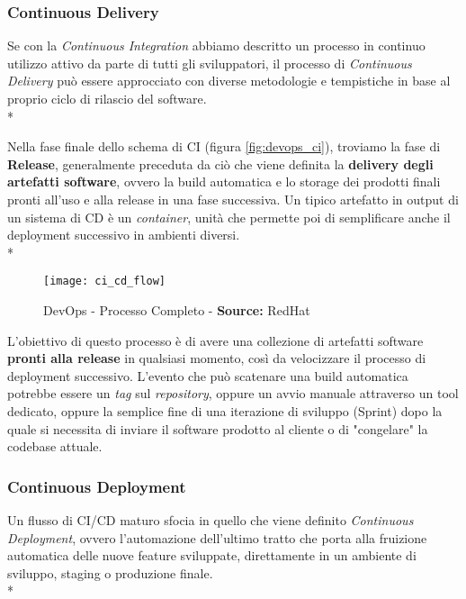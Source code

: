 \documentclass[../main.tex]{subfiles}
\begin{document}
        		\subsubsection{Continuous Delivery}
        			
        			Se con la \emph{Continuous Integration} abbiamo descritto un processo in continuo utilizzo attivo da parte di tutti gli sviluppatori, il processo di \emph{Continuous Delivery}\cite{devops_cicd} può essere approcciato con diverse metodologie e tempistiche in base al proprio ciclo di rilascio del software.\\*
        			
        			Nella fase finale dello schema di CI (figura \ref{fig:devops_ci}), troviamo la fase di \textbf{Release}, generalmente preceduta da ciò che viene definita la \textbf{delivery degli artefatti software}, ovvero la build automatica e lo storage dei prodotti finali pronti all'uso e alla release in una fase successiva. Un tipico artefatto in output di un sistema di CD è un \emph{container}, unità che permette poi di semplificare anche il deployment successivo in ambienti diversi.\\*
        			
        			\begin{figure}[ht]
        				\centering
        				\texttt{[image: ci\_cd\_flow]}
        				\caption{DevOps - Processo Completo - \textbf{Source:} RedHat}
        				\label{fig:ci_cd_flow}
        			\end{figure}
        			
        			L'obiettivo di questo processo è di avere una collezione di artefatti software \textbf{pronti alla release} in qualsiasi momento, così da velocizzare il processo di deployment successivo. L'evento che può scatenare una build automatica potrebbe essere un \emph{tag} sul \emph{repository}, oppure un avvio manuale attraverso un tool dedicato, oppure la semplice fine di una iterazione di sviluppo (Sprint) dopo la quale si necessita di inviare il software prodotto al cliente o di "congelare" la codebase attuale.
        		
        		\subsubsection{Continuous Deployment}
        		
        			Un flusso di CI/CD maturo sfocia in quello che viene definito \emph{Continuous Deployment}\cite{devops_cd}, ovvero l'automazione dell'ultimo tratto che porta alla fruizione automatica delle nuove feature sviluppate, direttamente in un ambiente di sviluppo, staging o produzione finale.\\*
        			
\end{document}
